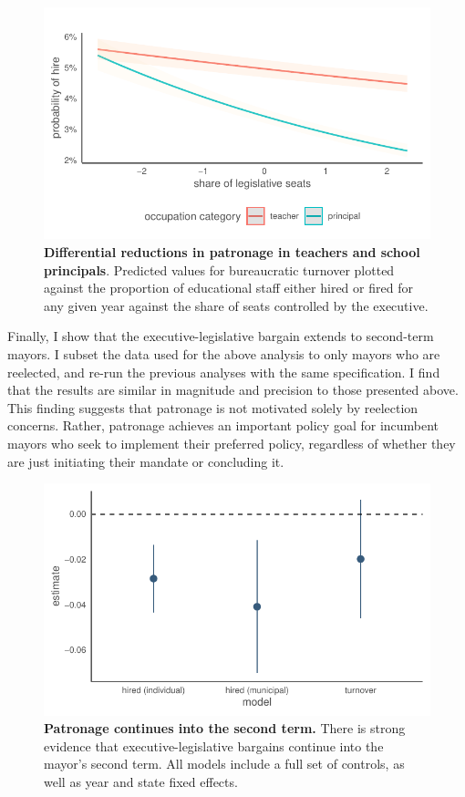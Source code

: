 \documentclass[12pt,a4paper]{article}
\begin{document}
\begin{figure}[h]
    \centering
    \includegraphics[width=0.6\linewidth]{plots/plot_interactions_logit}
    \caption{\textbf{Differential reductions in patronage in teachers and school principals}. Predicted values for bureaucratic turnover plotted against the proportion of educational staff either hired or fired for any given year against the share of seats controlled by the executive.}
    \label{fig:turnover}
\end{figure}

Finally, I show that the executive-legislative bargain extends to second-term mayors. I subset the data used for the above analysis to only mayors who are reelected, and re-run the previous analyses with the same specification. I find that the results are similar in magnitude and precision to those presented above. This finding suggests that patronage is not motivated solely by reelection concerns. Rather, patronage achieves an important policy goal for incumbent mayors who seek to implement their preferred policy, regardless of whether they are just initiating their mandate or concluding it.

\begin{figure}[h]
    \centering
    \includegraphics[width=0.6\linewidth]{plots/plot_coalition_coef_mun_second.pdf}
    \caption{\textbf{Patronage continues into the second term.} There is strong evidence that executive-legislative bargains continue into the mayor's second term. All models include a full set of controls, as well as year and state fixed effects.}
\end{figure}
\end{document}
